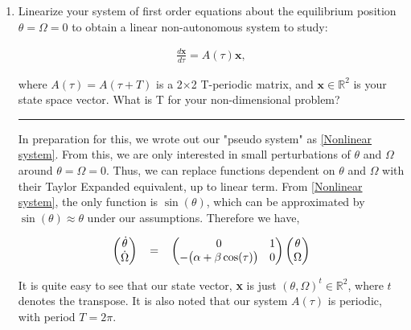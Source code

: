 \documentclass[12pt]{article}
\newcommand{\jump}{\vspace{5mm}}
\newcommand{\R}{\mathbb{R}}
\begin{document}
\begin{enumerate}[]
        \item Linearize your system of first order equations about the equilibrium position $\theta = \Omega = 0$ to obtain a linear non-autonomous system to study:

        \begin{align}
            \frac{d\textbf{x}}{d\tau} = A(\tau)\textbf{x}, \label{Linearized system}
        \end{align}

        where $A(\tau) = A(\tau + T)$ is a 2$\times$2 T-periodic matrix, and $\textbf{x} \in \R^{2}$ is your state space vector. What is T for your non-dimensional problem?
        
        \jump
        \hrule

        \begin{solution}
        
            In preparation for this, we wrote out our "pseudo system" as \ref{Nonlinear system}. From this, we are only interested in small perturbations of $\theta$ and $\Omega$ around $\theta = \Omega = 0$. Thus, we can replace functions dependent on $\theta$ and $\Omega$ with their Taylor Expanded equivalent, up to linear term. From \ref{Nonlinear system}, the only function is $\sin(\theta)$, which can be approximated by $\sin(\theta) \approx \theta$ under our assumptions. Therefore we have,

            \begin{align}
                \begin{pmatrix}
                    \dot{\theta}    \\
                    \dot{\Omega}
                \end{pmatrix}
                \hspace{3mm}
                =
                \hspace{3mm}
                \begin{pmatrix}
                    0   &1  \\
                    -\big( \alpha + \beta\cos(\tau)\big) &0
                \end{pmatrix}
                \begin{pmatrix}
                    \theta  \\
                    \Omega
                \end{pmatrix}   \label{Linear system}
            \end{align}

            It is quite easy to see that our state vector, \textbf{x} is just $(\theta, \Omega)^t \in \R^2$, where $t$ denotes the transpose. It is also noted that our system $A(\tau)$ is periodic, with period $T = 2\pi$.
        \end{solution}


\end{enumerate}
\end{document}
